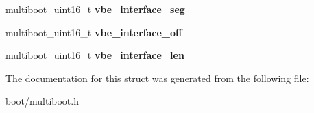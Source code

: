\begin{DoxyCompactItemize}
\item 
\hypertarget{structmultiboot__info_a204c99787efd58c0f54fe1e056b1d69f}{
multiboot\_\-uint16\_\-t {\bfseries vbe\_\-interface\_\-seg}}
\label{structmultiboot__info_a204c99787efd58c0f54fe1e056b1d69f}

\item 
\hypertarget{structmultiboot__info_a1621d51b1cc198a1496e9f61b3708291}{
multiboot\_\-uint16\_\-t {\bfseries vbe\_\-interface\_\-off}}
\label{structmultiboot__info_a1621d51b1cc198a1496e9f61b3708291}

\item 
\hypertarget{structmultiboot__info_ab3c537df524db1ed0aeaa2e6f61a23e6}{
multiboot\_\-uint16\_\-t {\bfseries vbe\_\-interface\_\-len}}
\label{structmultiboot__info_ab3c537df524db1ed0aeaa2e6f61a23e6}

\end{DoxyCompactItemize}


The documentation for this struct was generated from the following file:\begin{DoxyCompactItemize}
\item 
boot/multiboot.h\end{DoxyCompactItemize}
